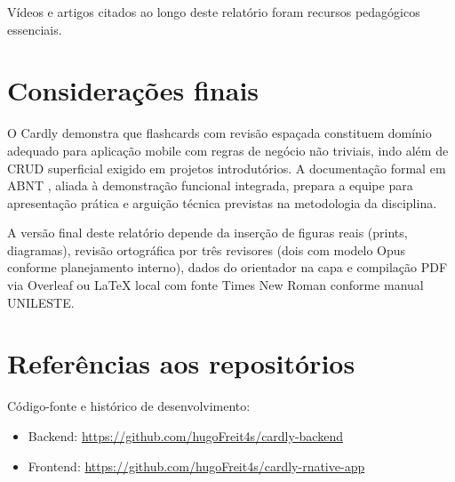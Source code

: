Vídeos e artigos citados ao longo deste relatório \cite{youtube_spring_boot_api,medium_spaced_repetition} foram recursos pedagógicos essenciais.

\section{Considerações finais}

O Cardly demonstra que flashcards com revisão espaçada constituem domínio adequado para aplicação mobile com regras de negócio não triviais, indo além de CRUD superficial exigido em projetos introdutórios. A documentação formal em ABNT \cite{abnt_nbr14724,abnt_nbr6023}, aliada à demonstração funcional integrada, prepara a equipe para apresentação prática e arguição técnica previstas na metodologia da disciplina.

A versão final deste relatório depende da inserção de figuras reais (prints, diagramas), revisão ortográfica por três revisores (dois com modelo Opus conforme planejamento interno), dados do orientador na capa e compilação PDF via Overleaf ou LaTeX local com fonte Times New Roman conforme manual UNILESTE.

\section{Referências aos repositórios}

Código-fonte e histórico de desenvolvimento:
\begin{itemize}
    \item Backend: \url{https://github.com/hugoFreit4s/cardly-backend} \cite{cardly_backend_repo}
    \item Frontend: \url{https://github.com/hugoFreit4s/cardly-rnative-app} \cite{cardly_frontend_repo}
\end{itemize}
